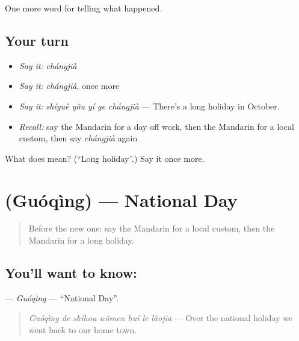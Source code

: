 \begin{grammarlens}[title={What you've built}]
One more word for telling what happened.
\end{grammarlens}

\subsection*{Your turn}
\begin{itemize}
\raggedright
  \item \emph{Say it:} \emph{chángjià}
  \item \emph{Say it:} \emph{chángjià}, once more
  \item \emph{Say it:} \emph{shíyuè yǒu yí ge chángjià} — There's a long holiday in October.
  \item \emph{Recall:} say the Mandarin for a day off work, then the Mandarin for a local custom, then say \emph{chángjià} again
\end{itemize}

\begin{tcolorbox}[breakable,colback=teal!4,colframe=teal!35!black,title={Before you move on}]
What does  mean? (\textquotedblleft{}Long holiday\textquotedblright{}.) Say it once more.
\end{tcolorbox}
\section[\texorpdfstring{\zh{国庆} (Guóqìng)}{国庆 (Guóqìng)}]{ (Guóqìng) — National Day}

\label{lesson:ZH-C339-guoqing}



\begin{quote}
Before the new one: say the Mandarin for a local custom, then the Mandarin for a long holiday.
\end{quote}

\subsection*{You'll want to know: }
\textbf{} — \emph{Guóqìng} — \textquotedblleft{}National Day\textquotedblright{}.

\begin{quote}
\textbf{} \emph{Guóqìng de shíhou wǒmen huí le lǎojiā} — Over the national holiday we went back to our home town.
\end{quote}

